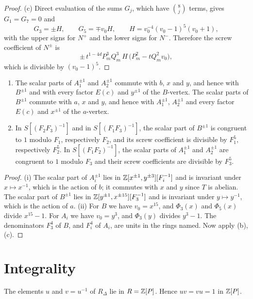 \documentclass[11pt,colorlinks]{charlie}
\begin{document}
\begin{proof}
(c) Direct evaluation of the sums $G_j$, which have $\binom8j$ terms, gives $G_1=G_7=0$ and
\[
  G_3=\pm H,\qquad G_5=\mp v_0H,\qquad H=v_0^{-4}(v_0-1)^5(v_0+1),
\]
with the upper signs for $N^+$ and the lower signs for $N^-$. Therefore the screw coefficient of $N^\pm$ is
\[
  \pm\,t^{1-4d}P_m^3Q_m^3\,H\,\bigl(P_m^2-tQ_m^2v_0\bigr),
\]
which is divisible by $(v_0-1)^5$.
\end{proof}

\begin{corollary}\label{cor:interact}
\begin{enumerate}[label=\textup{(\roman*)}]
\item The scalar parts of $A_1^{\pm1}$ and $A_2^{\pm1}$ commute with $b$, $x$ and $y$, and hence with $B^{\pm1}$ and with every factor $E(c)$ and $y^{\pm1}$ of the $B$-vertex. The scalar parts of $B^{\pm1}$ commute with $a$, $x$ and $y$, and hence with $A_1^{\pm1}$, $A_2^{\pm1}$ and every factor $E(c)$ and $x^{\pm1}$ of the $a$-vertex.
\item In $S[(F_2F_3)^{-1}]$ and in $S[(F_1F_3)^{-1}]$, the scalar part of $B^{\pm1}$ is congruent to $1$ modulo $F_1$, respectively $F_2$, and its screw coefficient is divisible by $F_1^5$, respectively $F_2^5$. In $S[(F_1F_2)^{-1}]$, the scalar parts of $A_1^{\pm1}$ and $A_2^{\pm1}$ are congruent to $1$ modulo $F_3$ and their screw coefficients are divisible by $F_3^5$.
\end{enumerate}
\end{corollary}

\begin{proof}
(i) The scalar part of $A_i^{\pm1}$ lies in $\mathbb{Z}[x^{\pm1},y^{\pm3}][F_i^{-1}]$ and is invariant under $x\mapsto x^{-1}$, which is the action of $b$; it commutes with $x$ and $y$ since $T$ is abelian. The scalar part of $B^{\pm1}$ lies in $\mathbb{Z}[y^{\pm1},x^{\pm15}][F_3^{-1}]$ and is invariant under $y\mapsto y^{-1}$, which is the action of $a$.
(ii) For $B$ we have $v_0=x^{15}$, and $\Phi_3(x)$ and $\Phi_5(x)$ divide $x^{15}-1$. For $A_i$ we have $v_0=y^3$, and $\Phi_3(y)$ divides $y^3-1$. The denominators $F_3^4$ of $B$, and $F_i^4$ of $A_i$, are units in the rings named. Now apply (b),(c).
\end{proof}

\section{Integrality}\label{sec:integral}

\begin{theorem}\label{thm:integral}
The elements $u$ and $v=u^{-1}$ of $R_\Delta$ lie in $R=\mathbb{Z}[P]$. Hence $uv=vu=1$ in $\mathbb{Z}[P]$.
\end{theorem}
\end{document}
